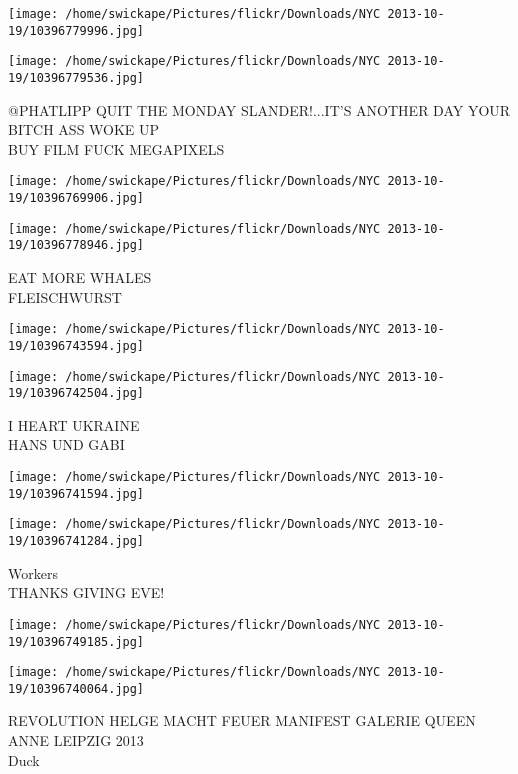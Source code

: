 \documentclass[10pt,letterpaper]{article}
\begin{document}
\texttt{[image: /home/swickape/Pictures/flickr/Downloads/NYC 2013-10-19/10396779996.jpg]}

\vspace{0.25in}
\texttt{[image: /home/swickape/Pictures/flickr/Downloads/NYC 2013-10-19/10396779536.jpg]}

@PHATLIPP QUIT THE MONDAY SLANDER!...IT'S ANOTHER DAY YOUR BITCH ASS WOKE UP\\
BUY FILM FUCK MEGAPIXELS\\
\pagebreak

\texttt{[image: /home/swickape/Pictures/flickr/Downloads/NYC 2013-10-19/10396769906.jpg]}

\vspace{0.25in}
\texttt{[image: /home/swickape/Pictures/flickr/Downloads/NYC 2013-10-19/10396778946.jpg]}

EAT MORE WHALES\\
FLEISCHWURST\\
\pagebreak

\texttt{[image: /home/swickape/Pictures/flickr/Downloads/NYC 2013-10-19/10396743594.jpg]}

\vspace{0.25in}
\texttt{[image: /home/swickape/Pictures/flickr/Downloads/NYC 2013-10-19/10396742504.jpg]}

I HEART UKRAINE\\
HANS UND GABI\\
\pagebreak

\texttt{[image: /home/swickape/Pictures/flickr/Downloads/NYC 2013-10-19/10396741594.jpg]}

\vspace{0.25in}
\texttt{[image: /home/swickape/Pictures/flickr/Downloads/NYC 2013-10-19/10396741284.jpg]}

Workers\\
THANKS GIVING EVE!\\
\pagebreak

\texttt{[image: /home/swickape/Pictures/flickr/Downloads/NYC 2013-10-19/10396749185.jpg]}

\vspace{0.25in}
\texttt{[image: /home/swickape/Pictures/flickr/Downloads/NYC 2013-10-19/10396740064.jpg]}

REVOLUTION HELGE MACHT FEUER MANIFEST GALERIE QUEEN ANNE LEIPZIG 2013\\
Duck\\
\pagebreak
\end{document}
